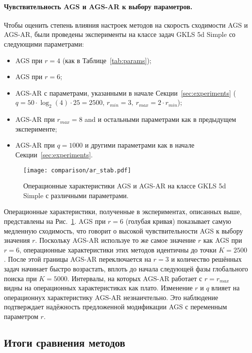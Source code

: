 \paragraph{Чувствительность AGS и AGS-AR к выбору параметров.}

Чтобы оценить степень влияния настроек методов на скорость сходимости AGS и AGS-AR, были проведены
эксперименты на классе задач GKLS 5d Simple со следующими параметрами:
\begin{itemize}
  \item AGS при $r=4$ (как в Таблице~\ref{tab:params});
  \item AGS при $r=6$;
  \item AGS-AR с параметрами, указанными в начале Секции~\ref{sec:experiments}
  ($q=50\cdot\log_2(4)\cdot 25 = 2500$, $r_{min}=3,\:r_{max}=2\cdot r_{min}$);
  \item AGS-AR при $r_{max}=8$ and и остальными параметрами как в предыдущем эксперименте;
  \item AGS-AR при $q=1000$ и другими параметрами как в начале Секции~\ref{sec:experiments}.
\end{itemize}

\begin{figure}[ht]
  \centering
  \texttt{[image: comparison/ar\_stab.pdf]}
  \caption{Операционные характеристики AGS и AGS-AR на классе GKLS 5d Simple
  с различными параметрами.}
  \label{fig:stability}
\end{figure}

Операционные характеристики, полученные в экспериментах, описанных выше, представлены на Рис.~\ref{fig:stability}.
AGS при $r=6$ (голубая кривая) показывает самую медленную сходимость, что говорит о высокой чувствительности AGS
к выбору значения $r$. Поскольку AGS-AR используе то же самое значение $r$ как AGS при $r=6$, операционные характеристики
этих методов идентичны до точки $K=2500$. После этой границы AGS-AR переключается на $r=3$ и количество решённых задач
начинает быстро возрастать, вплоть до начала следующей фазы глобального поиска при $K=5000$. Интервалы, на которых
AGS-AR работает с $r=r_{max}$ видны на операционных характеристиках как плато. Изменение $r$ и $q$ влияет на операционнух характеристику
AGS-AR незнаичтельно. Это наблюдение подтверждает надёжность предложенной модификации AGS с переменным параметром $r$.

\subsection{Итоги сравнения методов}

